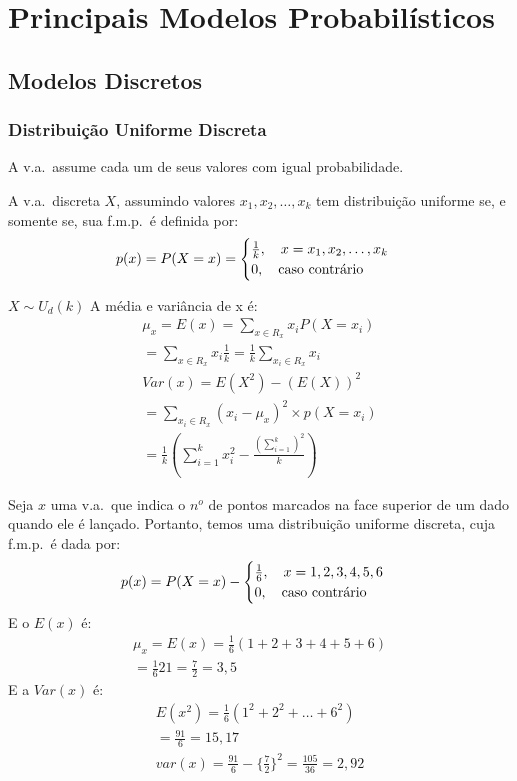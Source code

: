 \chapter{Principais Modelos Probabilísticos}
 \section{Modelos Discretos}
 \subsection{Distribuição Uniforme Discreta}
 \begin{description}
   \item  A v.a.\ assume cada um de seus valores com igual probabilidade.

   \item [Definição:] A v.a.\ discreta $X$, assumindo valores $x_1,x_2,\dots,x_k$ tem 
 distribuição uniforme se, e somente se, sua f.m.p.\ é definida por: 
 \begin{align}
   p(x)=P(X=x)=\begin{cases}
     \frac{1}{k}, \text{\quad} x=x_1,x_2,\dots,x_k\\
     0, \text{\quad caso contrário}
   \end{cases}
 \end{align}
\item  [Notação:] $X \sim U_{d}(k)$
 A média e variância de x é:
 \begin{align}
   \mu_{x}=E(x)=\sum_{x \in R_{x}}x_i P(X=x_i)\\ \nonumber
   = \sum_{x \in R_{x}}x_i \frac{1}{k}= \frac{1}{k}\sum_{x_i \in R_{x}} x_i\\
   Var(x)=E(X^2)-\left(E(X)\right)^2\\ \nonumber
   = \sum_{x_i \in R_{x}}\left(x_i -\mu_x \right)^2 \times p\left(X=x_i \right)\\  
   =\frac{1}{k} \left(\sum^k_{i=1} x_i^2 - \frac{(\sum_{i=1}^k)^2}{k}\right) \nonumber
 \end{align}
\item [Exemplo:] Seja $x$ uma v.a.\ que indica o $n^o$ de pontos marcados na face 
 superior de um dado quando ele é lançado. Portanto, temos uma distribuição 
 uniforme discreta, cuja f.m.p.\ é dada por: 
 \begin{align}
   p(x)=P(X=x)-\begin{cases}
     \frac{1}{6},\text{\quad} x=1,2,3,4,5,6\\
     0, \text{\quad caso contrário}
   \end{cases}
 \end{align}
 E o $E(x)$ é: 
 \begin{align}
   \mu_{x}=E(x)=\frac{1}{6}(1+2+3+4+5+6)\\
   =\frac{1}{6}21= \frac{7}{2}=3,5
 \end{align}
 E a $Var(x)$ é:
 \begin{align}
   E(x^2)=\frac{1}{6}(1^2 + 2^2 + \dots + 6^2)\\
   =\frac{91}{6}=15,17\\
   var(x)=\frac{91}{6}- \{\frac{7}{2}\}^2=\frac{105}{36}=2,92
 \end{align}
 \end{description}
